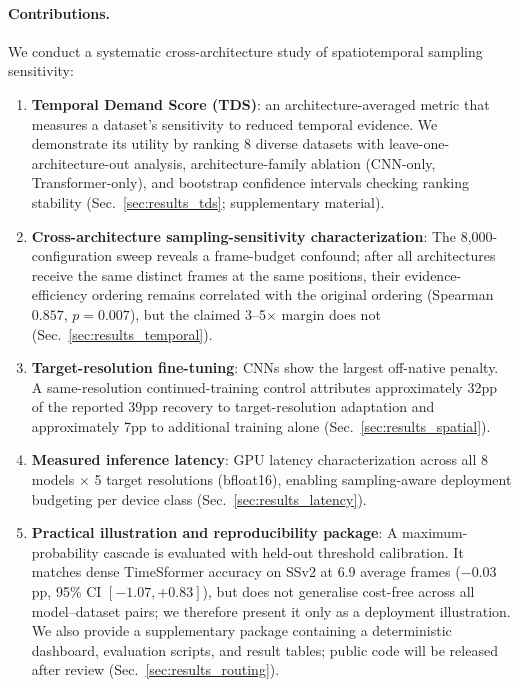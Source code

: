 \documentclass[runningheads]{llncs}
\newcommand{\TDS}{\textsc{TDS}}
\newcommand{\rev}[1]{\textcolor{revblue}{#1}}
\newcommand{\revdel}[1]{}
\begin{document}
\paragraph{Contributions.}
We conduct a systematic cross-architecture study of \rev{spatiotemporal sampling sensitivity}:
\begin{enumerate}[leftmargin=*,topsep=2pt,itemsep=1pt]
\item \textbf{Temporal Demand Score (\TDS{})}: an architecture-averaged metric that measures a dataset's \rev{sensitivity to reduced temporal evidence}. We demonstrate its utility by ranking 8 diverse datasets with leave-one-architecture-out analysis, architecture-family ablation (CNN-only, Transformer-only), and bootstrap confidence intervals checking ranking stability (Sec.~\ref{sec:results_tds}; supplementary material). 
\item \textbf{Cross-architecture \rev{sampling-sensitivity} characterization}: \revdel{8,000 core evaluation configurations show strong empirical architecture-level differences within our pool, with VideoMamba and TimeSformer losing 3--5$\times$ less accuracy under stride stress than CNNs and ViViT; this is an association, not a controlled temporal-module ablation.} \rev{The 8,000-configuration sweep reveals a frame-budget confound; after all architectures receive the same distinct frames at the same positions, their evidence-efficiency ordering remains correlated with the original ordering (Spearman $0.857$, $p=0.007$), but the claimed 3--5$\times$ margin does not} (Sec.~\ref{sec:results_temporal}).
\item \textbf{Target-resolution fine-tuning}: \revdel{Fine-tuning each model at the target spatial resolution closes the cross-resolution gap by up to 39pp for CNNs. In contrast, Transformers naturally maintain accuracy across different image sizes and require no retraining.}\rev{CNNs show the largest off-native penalty. A same-resolution continued-training control attributes approximately 32pp of the reported 39pp recovery to target-resolution adaptation and approximately 7pp to additional training alone} (Sec.~\ref{sec:results_spatial}).
\item \textbf{Measured inference latency}: GPU latency characterization
across all 8 models $\times$ 5 target resolutions (bfloat16), enabling sampling-aware deployment budgeting per device class (Sec.~\ref{sec:results_latency}).
\item \textbf{Practical illustration and reproducibility package}: \revdel{old claim: 52\% fewer frames without loss.} \rev{A maximum-probability cascade is evaluated with held-out threshold calibration. It matches dense TimeSformer accuracy on SSv2 at 6.9 average frames ($-0.03$pp, 95\% CI $[-1.07,+0.83]$), but does not generalise cost-free across all model--dataset pairs; we therefore present it only as a deployment illustration.} We also provide a supplementary package containing a deterministic dashboard, evaluation scripts, and result tables; public code will be released after review (Sec.~\ref{sec:results_routing}).
\end{enumerate}
\end{document}

